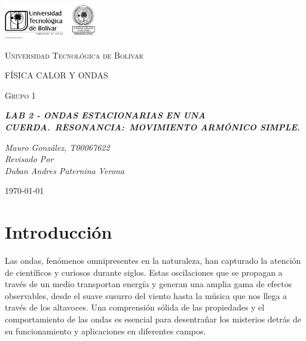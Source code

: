 \documentclass[twocolumn, 12pt]{article}
\begin{document}
\begin{titlepage}
    \centering
    \includegraphics[width=0.3\textwidth]{Images/logo_utb.png}\par\vspace{1cm}
    {\scshape\LARGE Universidad Tecnológica de Bolívar \par}
    \vspace{1cm}

    {\scshape\Large FÍSICA CALOR Y ONDAS \par}
    \vspace{.2cm}

    {\scshape\Large Grupo 1 \par}
    \vspace{1cm}
    \slshape {\Large \bfseries{}LAB 2 - ONDAS ESTACIONARIAS EN UNA CUERDA.~RESONANCIA:\@{}~MOVIMIENTO ARMÓNICO SIMPLE.\\}
    \vspace{4cm}

    \slshape {\itshape{} Mauro González, T00067622 \\}
    \vfill
    Revisado Por \\
    Duban Andres Paternina Verona\\
    {\large \today\par}
\end{titlepage}

\section{Introducción}

Las ondas, fenómenos omnipresentes en la naturaleza, han
capturado la atención de científicos y curiosos durante
siglos. Estas oscilaciones que se propagan a través de un
medio transportan energía y generan una amplia gama de
efectos observables, desde el suave susurro del viento
hasta la música que nos llega a través de los altavoces.
Una comprensión sólida de las propiedades y el
comportamiento de las ondas es esencial para desentrañar
los misterios detrás de su funcionamiento y aplicaciones en
diferentes campos.
\end{document}
